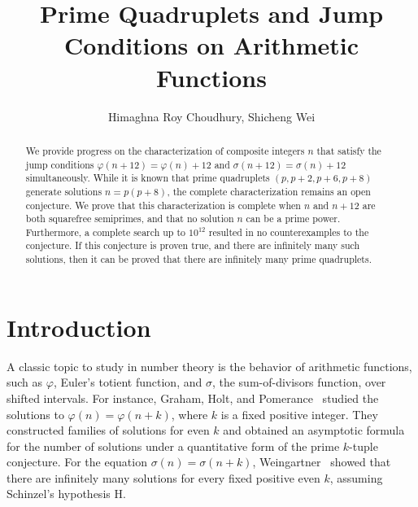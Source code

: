 \documentclass[12pt, twoside]{amsart}
\title{Prime Quadruplets and Jump Conditions on Arithmetic Functions}
\author{Himaghna Roy Choudhury, Shicheng Wei}
\theoremstyle{definition}
\begin{document}
\begin{abstract}
We provide progress on the characterization of composite integers $n$ that satisfy the jump conditions $\varphi(n+12)=\varphi(n)+12$ and $\sigma(n+12)=\sigma(n)+12$ simultaneously. While it is known that prime quadruplets $(p,p+2,p+6,p+8)$ generate solutions $n=p(p+8)$, the complete characterization remains an open conjecture. We prove that this characterization is complete when $n$ and $n+12$ are both squarefree semiprimes, and that no solution $n$ can be a prime power. Furthermore, a complete search up to $10^{12}$ resulted in no counterexamples to the conjecture. If this conjecture is proven true, and there are infinitely many such solutions, then it can be proved that there are infinitely many prime quadruplets.
\end{abstract}

\maketitle

\section{Introduction}\label{sec:intro}


A classic topic to study in number theory is the behavior of arithmetic functions, such as $\varphi$, Euler's totient function, and $\sigma$, the sum-of-divisors function, over shifted intervals. For instance, Graham, Holt, and Pomerance~\cite{GrahamHoltPomerance1999} studied the solutions to $\varphi(n)=\varphi(n+k)$, where $k$ is a fixed positive integer. They constructed families of solutions for even $k$ and obtained an asymptotic formula for the number of solutions under a quantitative form of the prime $k$-tuple conjecture. For the equation $\sigma(n)=\sigma(n+k)$, Weingartner~\cite{Weingartner2011} showed that there are infinitely many solutions for every fixed positive even $k$, assuming Schinzel's hypothesis H.
\end{document}
